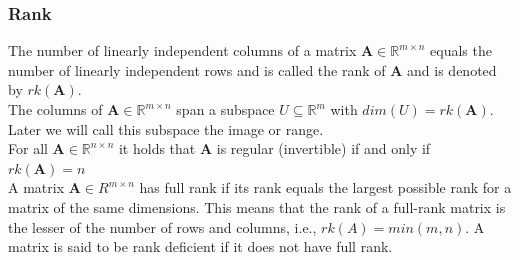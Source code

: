 \subsubsection{Rank}
The number of linearly independent columns of a matrix $\mathbf{A} \in \mathbb{R}^{m\times n}$ equals the number of linearly independent rows and is called the rank of $\mathbf{A}$ and is denoted by $rk(\mathbf{A})$.\\
The columns of $\mathbf{A} \in \mathbb{R}^{m\times n}$ span a subspace $U \subseteq \mathbb{R}^m$ with $dim(U) = rk(\mathbf{A})$. Later we will call this subspace the image or range.\\
For all $\mathbf{A} \in \mathbb{R}^{n\times n}$ it holds that $\mathbf{A}$ is regular (invertible) if and only if $rk(\mathbf{A}) = n$\\
A matrix $\mathbf{A} \in R^{m\times n}$ has full rank if its rank equals the largest possible rank for a matrix of the same dimensions. This means that the rank of
a full-rank matrix is the lesser of the number of rows and columns, i.e.,
$rk(A) = min(m, n)$. A matrix is said to be rank deficient if it does not
have full rank.

